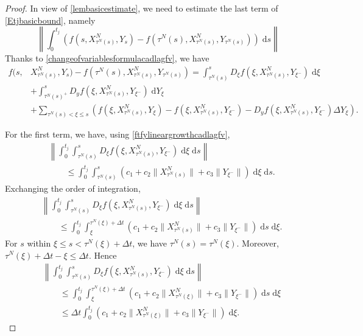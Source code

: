 \documentclass[reqno,12pt]{amsart}
\theoremstyle{plain} %
\theoremstyle{definition} %
\begin{document}
\begin{proof}
    In view of \cref{lembasicestimate}, we need to estimate the last term of \eqref{Etjbasicbound}, namely
    \[
        \left\|\int_0^{t_j} \left( f(s, X_{\tau^N(s)}^N, Y_s) - f(\tau^N(s), X_{\tau^N(s)}^N, Y_{\tau^N(s)}) \right)\;\mathrm{d}s\right\|
    \]
    Thanks to \eqref{changeofvariablesformulacadlagfv}, we have
    \begin{align*}
        f(s, & X_{\tau^N(s)}^N, Y_s) - f(\tau^N(s), X_{\tau^N(s)}^N, Y_{\tau^N(s)}) = \int_{\tau^N(s)}^s D_\xi f(\xi, X_{\tau^N(s)}^N, Y_{\xi^-})\;\mathrm{d}\xi \\
        & + \int_{\tau^N(s)^+}^s D_y f(\xi, X_{\tau^N(s)}^N, Y_{\xi^-}) \;\mathrm{d}Y_\xi \\
        & + \sum_{\tau^N(s) < \xi \leq s} \left(f(\xi, X_{\tau^N(s)}^N, Y_\xi) - f(\xi, X_{\tau^N(s)}^N, Y_{\xi^{-}}) - D_y f(\xi, X_{\tau^N(s)}^N, Y_{\xi^-})\Delta Y_\xi\right).
    \end{align*}
    
    For the first term, we have, using \eqref{ftfylineargrowthcadlagfv},
    \begin{align*}
        & \left\|\int_0^{t_j} \int_{\tau^N(s)}^s D_\xi f(\xi, X_{\tau^N(s)}^N, Y_{\xi^-})\;\mathrm{d}\xi\;\mathrm{d}s\right\| \\
        & \qquad \leq \int_0^{t_j} \int_{\tau^N(s)}^s \left(c_1 + c_2 \|X_{\tau^N(s)}^N\| + c_3\|Y_{\xi^-}\|\right)\;\mathrm{d}\xi\;\mathrm{d}s.
    \end{align*}
    Exchanging the order of integration,
    \begin{align*}
        & \left\|\int_0^{t_j} \int_{\tau^N(s)}^s D_\xi f(\xi, X_{\tau^N(s)}^N, Y_{\xi^-})\;\mathrm{d}\xi\;\mathrm{d}s\right\| \\
        & \qquad \leq \int_0^{t_j} \int_{\xi}^{\tau^N(\xi) + \Delta t} \left(c_1 + c_2 \|X_{\tau^N(s)}^N\| + c_3\|Y_{\xi^-}\|\right)\;\mathrm{d}s\;\mathrm{d}\xi.
    \end{align*}
    For $s$ within $\xi \leq s < \tau^N(\xi) + \Delta t$, we have $\tau^N(s) = \tau^N(\xi)$. Moreover, $\tau^N(\xi) + \Delta t - \xi \leq \Delta t$. Hence
    \begin{align*}
        & \left\|\int_0^{t_j} \int_{\tau^N(s)}^s D_\xi f(\xi, X_{\tau^N(s)}^N, Y_{\xi^-})\;\mathrm{d}\xi\;\mathrm{d}s\right\| \\
        & \qquad \leq \int_0^{t_j} \int_{\xi}^{\tau^N(\xi) + \Delta t} \left(c_1 + c_2 \|X_{\tau^N(\xi)}^N\| + c_3\|Y_{\xi^-}\|\right)\;\mathrm{d}s\;\mathrm{d}\xi \\
        & \qquad \leq \Delta t\int_0^{t_j} \left(c_1 + c_2 \|X_{\tau^N(\xi)}^N\| + c_3\|Y_{\xi^-}\|\right)\;\mathrm{d}\xi.
    \end{align*}


\end{proof}
\end{document}
